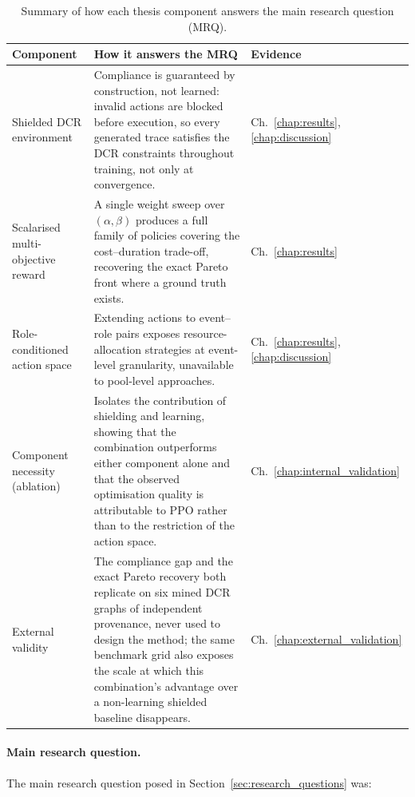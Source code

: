 \begin{table}[H]
\centering
\caption{Summary of how each thesis component answers the main research question (MRQ).}
\label{tab:mrq_answers}
\renewcommand{\arraystretch}{1.3}
\begin{tabularx}{\linewidth}{p{3.4cm} X p{2.6cm}}
\toprule
\textbf{Component} & \textbf{How it answers the MRQ} & \textbf{Evidence} \\
\midrule

Shielded \ac{DCR} environment &
Compliance is guaranteed by construction, not learned: invalid actions are blocked before execution, so every generated trace satisfies the \ac{DCR} constraints throughout training, not only at convergence. &
Ch.~\ref{chap:results}, \ref{chap:discussion} \\
\addlinespace

Scalarised multi-objective reward &
A single weight sweep over $(\alpha,\beta)$ produces a full family of policies covering the cost--duration trade-off, recovering the exact Pareto front where a ground truth exists. &
Ch.~\ref{chap:results} \\
\addlinespace

Role-conditioned action space &
Extending actions to event--role pairs exposes resource-allocation strategies at event-level granularity, unavailable to pool-level approaches. &
Ch.~\ref{chap:results}, \ref{chap:discussion} \\
\addlinespace

Component necessity (ablation) &
Isolates the contribution of shielding and learning, showing that the combination outperforms either component alone and that the observed optimisation quality is attributable to \ac{PPO} rather than to the restriction of the action space. &
Ch.~\ref{chap:internal_validation} \\
\addlinespace

External validity &
The compliance gap and the exact Pareto recovery both replicate on six mined \ac{DCR} graphs of independent provenance, never used to design the method; the same benchmark grid also exposes the scale at which this combination's advantage over a non-learning shielded baseline disappears. &
Ch.~\ref{chap:external_validation} \\

\bottomrule
\end{tabularx}
\end{table}

\paragraph{Main research question.} The main research question posed in Section~\ref{sec:research_questions} was:

